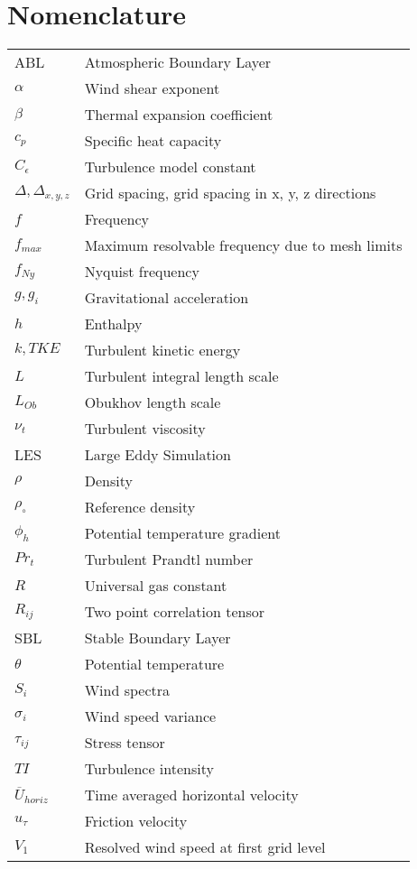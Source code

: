 \documentclass[conf]{new-aiaa}
\begin{document}
\section{Nomenclature}
{\renewcommand\arraystretch{1.0}
  \noindent\begin{longtable*}{@{}l @{\quad=\quad} l@{}}
ABL       & Atmospheric Boundary Layer \\
$\alpha$  & Wind shear exponent  \\
$\beta$   & Thermal expansion coefficient \\
$c_p$     & Specific heat capacity \\
$C_\epsilon$  & Turbulence model constant \\
$\Delta, \Delta_{x,y,z}$  & Grid spacing, grid spacing in x, y, z directions \\
$f$       & Frequency \\
$f_{max}$  & Maximum resolvable frequency due to mesh limits \\
$f_{Ny}$   & Nyquist frequency \\
$g, g_i$   & Gravitational acceleration \\
$h$       & Enthalpy \\
$k, TKE$  & Turbulent kinetic energy \\
$L$       & Turbulent integral length scale \\
$L_{Ob}$   & Obukhov length scale \\
$\nu_t$   & Turbulent viscosity \\
LES       & Large Eddy Simulation \\
$\rho$    & Density \\
$\rho_\circ$ & Reference density  \\
$\phi_h$  & Potential temperature gradient \\
$Pr_t$    & Turbulent Prandtl number \\
$R$       & Universal gas constant \\
$R_{ij}$   & Two point correlation tensor \\
SBL       & Stable Boundary Layer \\
$\theta$  & Potential temperature \\
$S_i$     & Wind spectra \\
$\sigma_i$ & Wind speed variance \\
$\tau_{ij}$ & Stress tensor \\
$TI$      & Turbulence intensity \\
$\overline{U}_{horiz}$ & Time averaged horizontal velocity \\
$u_\tau$   & Friction velocity    \\
$V_1$     & Resolved wind speed at first grid level 
\end{longtable*}}
\end{document}
